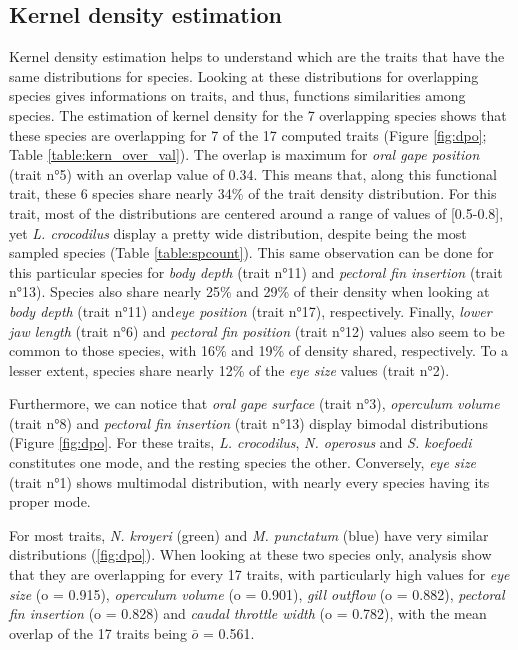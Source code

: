 \subsection{Kernel density estimation}
Kernel density estimation helps to understand which are the traits that have the same distributions for species. Looking at these distributions for overlapping species gives informations on traits, and thus, functions similarities among species. The estimation of kernel density for the 7 overlapping species shows that these species are overlapping for 7 of the 17 computed traits (Figure \ref{fig:dpo}; Table \ref{table:kern_over_val}). The overlap is maximum for \emph{oral gape position} (trait n°5) with an overlap value of 0.34. This means that, along this functional trait, these 6 species share nearly 34\% of the trait density distribution. For this trait, most of the distributions are centered around a range of values of [0.5-0.8], yet \textit{L. crocodilus} display a pretty wide distribution, despite being the most sampled species (Table \ref{table:spcount}). This same observation can be done for this particular species for \emph{body depth} (trait n°11) and \emph{pectoral fin insertion} (trait n°13). Species also share nearly 25\% and 29\% of their density when looking at \emph{body depth} (trait n°11) and\emph{eye position} (trait n°17), respectively. Finally, \emph{lower jaw length} (trait n°6) and \emph{pectoral fin position} (trait n°12) values also seem to be common to those species, with 16\% and 19\% of density shared, respectively. To a lesser extent, species share nearly 12\% of the \emph{eye size} values (trait n°2).

Furthermore, we can notice that \emph{oral gape surface} (trait n°3), \emph{operculum volume} (trait n°8) and \emph{pectoral fin insertion} (trait n°13) display bimodal distributions (Figure \ref{fig:dpo}. For these traits, \textit{L. crocodilus}, \textit{N. operosus} and \textit{S. koefoedi} constitutes one mode, and the resting species the other. Conversely, \emph{eye size} (trait n°1) shows multimodal distribution, with nearly every species having its proper mode.

For most traits, \textit{N. kroyeri} (green) and \textit{M. punctatum} (blue) have very similar distributions (\ref{fig:dpo}). When looking at these two species only, analysis show that they are overlapping for every 17 traits, with particularly high values for \emph{eye size} (o = 0.915), \emph{operculum volume} (o = 0.901), \emph{gill outflow} (o = 0.882), \emph{pectoral fin insertion} (o = 0.828) and \emph{caudal throttle width} (o = 0.782), with the mean overlap of the 17 traits being $\bar{o}$ = 0.561.


